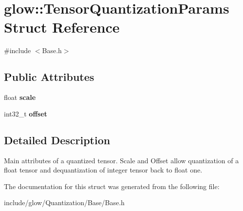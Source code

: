 \hypertarget{structglow_1_1_tensor_quantization_params}{}\section{glow\+:\+:Tensor\+Quantization\+Params Struct Reference}
\label{structglow_1_1_tensor_quantization_params}


{\ttfamily \#include $<$Base.\+h$>$}

\subsection*{Public Attributes}
\begin{DoxyCompactItemize}
\item 
\mbox{\label{structglow_1_1_tensor_quantization_params_a5a090cd6b175ccbaaa9e136543eb68fb}} 
float {\bfseries scale}
\item 
\mbox{\label{structglow_1_1_tensor_quantization_params_a613eb699fe981fbe51acd8899c3a5fe5}} 
int32\+\_\+t {\bfseries offset}
\end{DoxyCompactItemize}


\subsection{Detailed Description}
Main attributes of a quantized tensor. Scale and Offset allow quantization of a float tensor and dequantization of integer tensor back to float one. 

The documentation for this struct was generated from the following file\+:\begin{DoxyCompactItemize}
\item 
include/glow/\+Quantization/\+Base/Base.\+h\end{DoxyCompactItemize}
